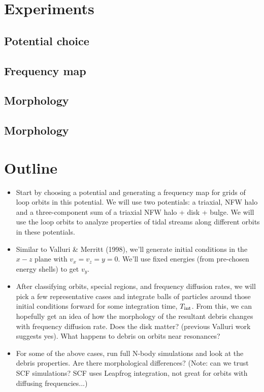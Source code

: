 \documentclass[letterpaper,12pt,preprint]{aastex}
\begin{document}
\section{Experiments}

\subsection{Potential choice}

\subsection{Frequency map}

\subsection{Morphology}

\subsection{Morphology}



\section{Outline}
\begin{itemize}
\item Start by choosing a potential and generating a frequency map for grids of loop orbits in this potential. We will use two potentials: a triaxial, NFW halo and a three-component sum of a triaxial NFW halo + disk + bulge. We will use the loop orbits to analyze properties of tidal streams along different orbits in these potentials.
\item Similar to Valluri \& Merritt (1998), we'll generate initial conditions in the $x-z$ plane with $v_x = v_z = y=0$. We'll use fixed energies (from pre-chosen energy shells) to get $v_y$. 
\item After classifying orbits, special regions, and frequency diffusion rates, we will pick a few representative cases and integrate balls of particles around those initial conditions forward for some integration time, $T_{\rm int}$. From this, we can hopefully get an idea of how the morphology of the resultant debris changes with frequency diffusion rate. Does the disk matter? (previous Valluri work suggests yes). What happens to debris on orbits near resonances?
\item For some of the above cases, run full N-body simulations and look at the debris properties. Are there morphological differences? (Note: can we trust SCF simulations? SCF uses Leapfrog integration, not great for orbits with diffusing frequencies...)

\end{itemize}
\end{document}
